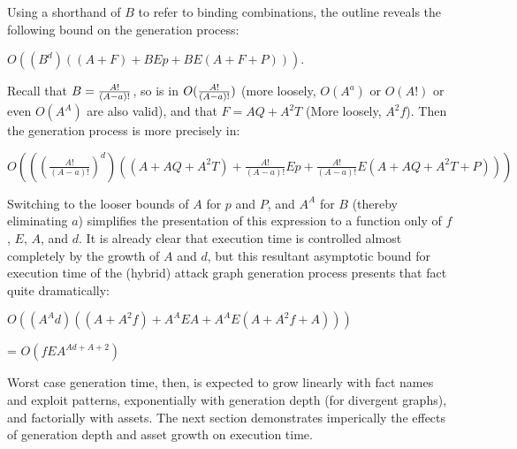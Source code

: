 Using a shorthand of $B$ to refer to binding combinations, the outline
reveals the following bound on the generation process:

$O((B^d)((A+F) + BEp + BE(A+F+P)))$.

Recall that $B = {A! \over (A-a)!}$, so is in $O({A! \over (A-a)!})$ 
(more loosely, $O(A^a)$ or $O(A!)$ or
even $O(A^A)$ are also valid), and that $F = AQ + A^2T$ (More loosely, $A^2f$). 
Then the generation process is more precisely in:

$O(((\frac{A!}{(A-a)!})^d)((A+AQ + A^2T) + \frac{A!}{(A-a)!}Ep + \frac{A!}{(A-a)!}E(A+AQ + A^2T+P)))$

Switching to the looser bounds of $A$ for $p$ and $P$, and $A^A$ for $B$ 
(thereby eliminating $a$) 
simplifies the presentation of this expression to a function only of $f$,
$E$, $A$, and $d$. It is already clear that execution time is controlled almost
completely by the growth of $A$ and $d$, but this resultant asymptotic bound for
execution time of the (hybrid) attack graph generation process presents that 
fact quite dramatically:

$O((A^Ad)((A+A^2f) + A^AEA + A^AE(A+A^2f+A)))$

= $O(fEA^{Ad+A+2})$

Worst case generation time, then, is expected to grow linearly with fact names 
and exploit patterns, exponentially with generation depth (for divergent 
graphs), and factorially with assets. The next section demonstrates imperically
the effects of generation depth and asset growth on execution time.

